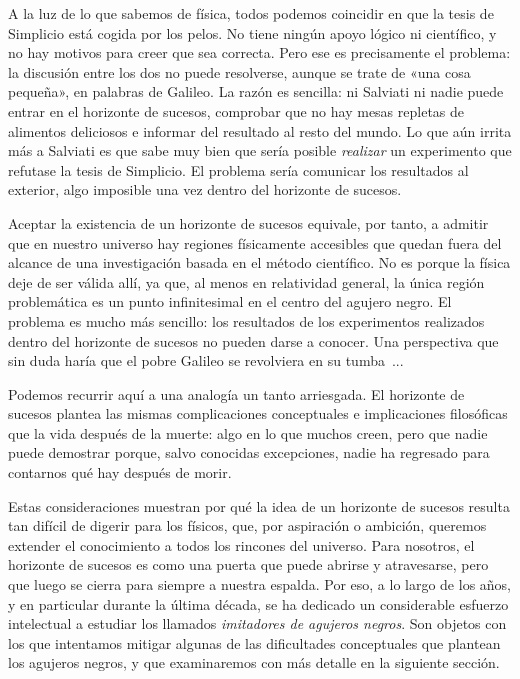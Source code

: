 A la luz de lo que sabemos de física, todos podemos coincidir en que la tesis de Simplicio está cogida por los pelos. No tiene ningún apoyo lógico ni científico, y no hay motivos para creer que sea correcta. Pero ese es precisamente el problema: la discusión entre los dos no puede resolverse, aunque se trate de «una cosa pequeña», en palabras de Galileo. La razón es sencilla: ni Salviati ni nadie puede entrar en el horizonte de sucesos, comprobar que no hay mesas repletas de alimentos deliciosos e informar del resultado al resto del mundo. Lo que aún irrita más a Salviati es que sabe muy bien que sería posible \emph{realizar} un experimento que refutase la tesis de Simplicio. El problema sería comunicar los resultados al exterior, algo imposible una vez dentro del horizonte de sucesos.

Aceptar la existencia de un horizonte de sucesos equivale, por tanto, a admitir que en nuestro universo hay regiones físicamente accesibles que quedan fuera del alcance de una investigación basada en el método científico. No es porque la física deje de ser válida allí, ya que, al menos en relatividad general, la única región problemática es un punto infinitesimal en el centro del agujero negro. El problema es mucho más sencillo: los resultados de los experimentos realizados dentro del horizonte de sucesos no pueden darse a conocer. Una perspectiva que sin duda haría que el pobre Galileo se revolviera en su tumba~...

Podemos recurrir aquí a una analogía un tanto arriesgada. El horizonte de sucesos plantea las mismas complicaciones conceptuales e implicaciones filosóficas que la vida después de la muerte: algo en lo que muchos creen, pero que nadie puede demostrar porque, salvo conocidas excepciones, nadie ha regresado para contarnos qué hay después de morir.

Estas consideraciones muestran por qué la idea de un horizonte de sucesos resulta tan difícil de digerir para los físicos, que, por aspiración o ambición, queremos extender el conocimiento a todos los rincones del universo. Para nosotros, el horizonte de sucesos es como una puerta que puede abrirse y atravesarse, pero que luego se cierra para siempre a nuestra espalda. Por eso, a lo largo de los años, y en particular durante la última década, se ha dedicado un considerable esfuerzo intelectual a estudiar los llamados \emph{imitadores de agujeros negros}. Son objetos con los que intentamos mitigar algunas de las dificultades conceptuales que plantean los agujeros negros, y que examinaremos con más detalle en la siguiente sección.

